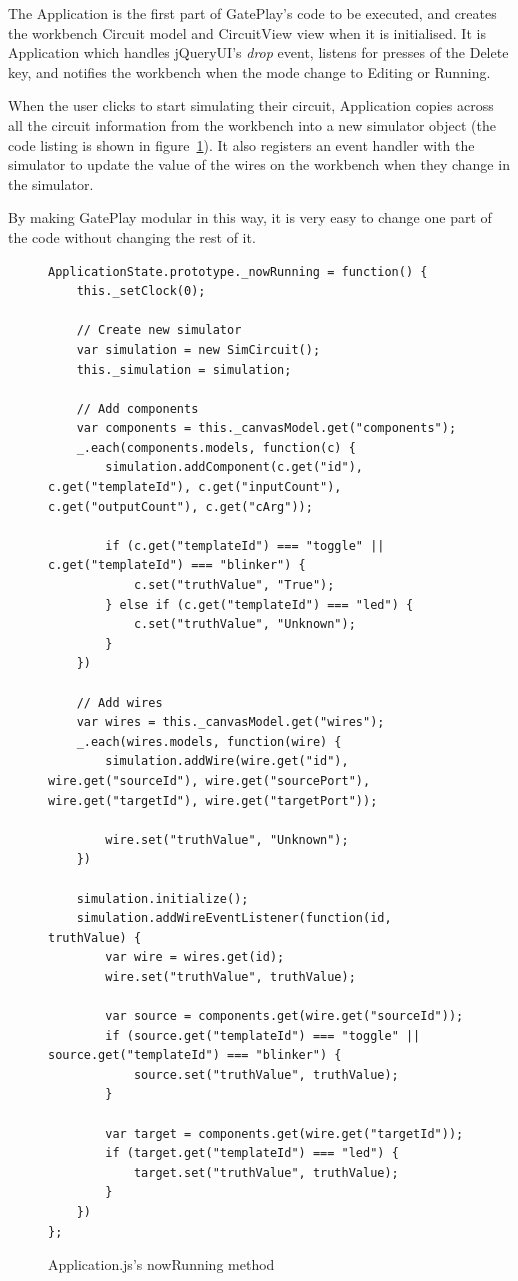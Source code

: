 The Application is the first part of GatePlay's code to be executed, and creates the workbench Circuit model and CircuitView view when it is initialised. It is Application which handles jQueryUI's \textit{drop} event, listens for presses of the Delete key, and notifies the workbench when the mode change to Editing or Running.

When the user clicks to start simulating their circuit, Application copies across all the circuit information from the workbench into a new simulator object (the code listing is shown in figure~\ref{fig:nowrunning}). It also registers an event handler with the simulator to update the value of the wires on the workbench when they change in the simulator.

By making GatePlay modular in this way, it is very easy to change one part of the code without changing the rest of it.

\begin{figure}
\begin{lstlisting}
ApplicationState.prototype._nowRunning = function() {
    this._setClock(0);

    // Create new simulator
    var simulation = new SimCircuit();
    this._simulation = simulation;

    // Add components
    var components = this._canvasModel.get("components");
    _.each(components.models, function(c) {
        simulation.addComponent(c.get("id"), c.get("templateId"), c.get("inputCount"), c.get("outputCount"), c.get("cArg"));

        if (c.get("templateId") === "toggle" || c.get("templateId") === "blinker") {
            c.set("truthValue", "True");
        } else if (c.get("templateId") === "led") {
            c.set("truthValue", "Unknown");
        }
    })

    // Add wires
    var wires = this._canvasModel.get("wires");
    _.each(wires.models, function(wire) {
        simulation.addWire(wire.get("id"), wire.get("sourceId"), wire.get("sourcePort"), wire.get("targetId"), wire.get("targetPort"));

        wire.set("truthValue", "Unknown");
    })

    simulation.initialize();
    simulation.addWireEventListener(function(id, truthValue) {
        var wire = wires.get(id);
        wire.set("truthValue", truthValue);

        var source = components.get(wire.get("sourceId"));
        if (source.get("templateId") === "toggle" || source.get("templateId") === "blinker") {
            source.set("truthValue", truthValue);
        }

        var target = components.get(wire.get("targetId"));
        if (target.get("templateId") === "led") {
            target.set("truthValue", truthValue);
        }
    })
};
\end{lstlisting}
\caption{Application.js's nowRunning method}
\label{fig:nowrunning}
\end{figure}